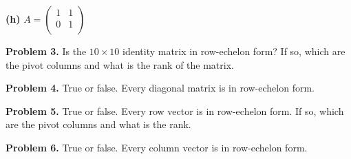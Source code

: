 \documentclass[oneside,12pt]{amsart}
\begin{document}
\bigskip
\bigskip
\bigskip
\bigskip
\bigskip
\bigskip

\textbf{(h)}
$
A =
\begin{pmatrix}
1 & 1 \\
0 & 1 \\
\end{pmatrix}
$

\bigskip
\bigskip
\bigskip
\bigskip
\bigskip
\bigskip

\textbf{Problem 3.} Is the $10\times 10$ identity matrix in row-echelon form?
If so, which are the pivot columns and what is the rank of the matrix.

\bigskip
\bigskip
\bigskip
\bigskip
\bigskip
\bigskip

\textbf{Problem 4.} True or false. Every diagonal matrix is in row-echelon form.

\bigskip
\bigskip
\bigskip
\bigskip
\bigskip
\bigskip

\textbf{Problem 5.} True or false. Every row vector is in row-echelon form.
If so, which are the pivot columns and what is the rank.

\bigskip
\bigskip
\bigskip
\bigskip
\bigskip
\bigskip

\textbf{Problem 6.} True or false. Every column vector is in row-echelon form.
\end{document}
